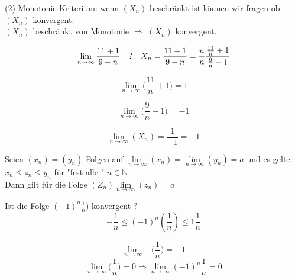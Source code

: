 (2) Monotonie Kriterium:
wenn $(X_n)$ beschränkt ist können wir fragen ob $(X_n)$    konvergent.\\


$(X_n)$ beschränkt von Monotonie $\Rightarrow$ $(X_n)$ konvergent.

\begin{remark}
\end{remark}

\begin{example}

\end{example}
\begin{equation}
    \lim\limits_{n \rightarrow \infty}{\frac{11+1}{9-n}}\quad ? \\
    \\\quad X_n = \frac{11+1}{9-n}=\frac{n}{n} \frac{\frac{11}{n}+1}{\frac{9}{n}-1}
\end{equation}

\begin{equation}
    \lim\limits_{n \rightarrow \infty}{\bigg(\frac{11}{n}+1\bigg)}=1
\end{equation}

\begin{equation}
    \lim\limits_{n \rightarrow \infty}{\bigg(\frac{9}{n}+1\bigg)}=-1
\end{equation}

\begin{equation}
    \lim\limits_{n \rightarrow \infty}{(X_n)}= \frac{1}{-1}=-1
\end{equation}

\begin{lemma}
    Seien $(x_n)=(y_n)$ Folgen auf $\lim\limits_{n \rightarrow \infty}{(x_n)}= \lim\limits_{n \rightarrow \infty}{(y_n)}= a$ und es gelte
    $x_n \leq z_n \leq y_n$ für "fest alle " $n \in \mathbb{N}$\\

    Dann gilt für die Folge $(Z_n) \lim\limits_{n \rightarrow \infty}{(z_n)}=a$
\end{lemma}

\begin{example}
    Ist die Folge $(-1)^n\frac{1}{n})$ konvergent ?\\

    \[ - \frac{1}{n} \leq(-1)^n(\frac{1}{n}) \leq 1 \frac{1}{n}\]

    \[ \lim\limits_{n \rightarrow \infty}{- \big(\frac{1}{n} \big)}= -1 \]
    \[ \lim\limits_{n \rightarrow \infty}{ \big(\frac{1}{n} \big)}= 0 \Rightarrow \lim\limits_{n \rightarrow \infty}{(-1)^n \frac{1}{n}}= 0
    \]
\end{example}

